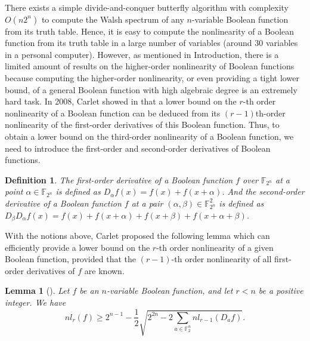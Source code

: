 \documentclass{article}
\newcommand{\F}{\mathbb{F}}
\newcommand{\0}{\textbf{0}}
\newcommand{\1}{\textbf{1}}
\theoremstyle{plain}
\newtheorem{lemma}{Lemma}
\newtheorem{definition}{Definition}
\begin{document}
    There exists a simple divide-and-conquer butterfly algorithm with complexity $O(n2^n)$ to compute the Walsh spectrum of any $n$-variable Boolean function from its truth table.
    Hence, it is easy to compute the nonlinearity of a Boolean function from its truth table in a large number of variables (around $30$ variables in a personal computer).
    However, as mentioned in Introduction, there is a limited amount of results on the higher-order nonlinearity of Boolean functions 
    because computing the higher-order nonlinearity, or even providing a tight lower bound, of a general Boolean function with high algebraic degree is an extremely hard task.
    In 2008, Carlet showed in \cite{Carlet2008lowbound_NL_profile} that a lower bound on the $r$-th order nonlinearity of a Boolean function can be deduced from its $(r-1)$th-order nonlinearity of the first-order derivatives of this Boolean function.
    Thus, to obtain a lower bound on the third-order nonlinearity of a Boolean function, we need to introduce the first-order and second-order derivatives of Boolean functions.
    \begin{definition}
        The first-order derivative of a Boolean function $f$ over $\F_{2^n}$ at a point $\alpha\in\F_{2^n}$ is defined as $D_{\alpha}f(x)=f(x)+f(x+\alpha)$.
        And the second-order derivative of a Boolean function $f$ at a pair $(\alpha,\beta)\in\F_{2^n}^2$ is defined as $D_{\beta}D_{\alpha}f(x)=f(x)+f(x+\alpha)+f(x+\beta)+f(x+\alpha+\beta)$.
    \end{definition}
    With the notions above, Carlet proposed the following lemma which can efficiently provide a lower bound on the $r$-th order nonlinearity of a given Boolean function, 
    provided that the $(r-1)$-th order nonlinearity of all first-order derivatives of $f$ are known.
    \begin{lemma}[\cite{Carlet2008lowbound_NL_profile}]\label{thm:High_order_nl_bound1}
        Let $f$ be an $n$-variable Boolean function, and let $r<n$ be a positive integer.
        We have
        \[nl_r(f)\ge 2^{n-1}-\frac{1}{2}\sqrt{2^{2n}-2\sum_{a\in\F_2^n}nl_{r-1}(D_af)}.\]
    \end{lemma}
\end{document}
